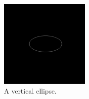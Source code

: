 \begin{figure}
	\centering
	\begin{subfigure}{0.48\linewidth}
		\centering
		\includegraphics[width=\linewidth]{Materials/hEllipse}
		\caption{A vertical ellipse.\newline\newline}
		\label{hEllipse}
	\end{subfigure}
	\hfill
	\begin{subfigure}{0.48\linewidth}
		\centering

\end{subfigure}
\end{figure}
